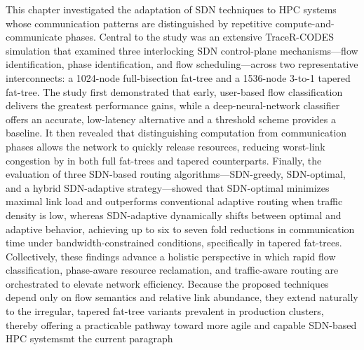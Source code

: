 This chapter investigated the adaptation of SDN techniques to HPC systems whose
communication patterns are distinguished by repetitive compute-and-communicate
phases. Central to the study was an extensive TraceR-CODES simulation that
examined three interlocking SDN control-plane mechanisms—flow identification,
phase identification, and flow scheduling—across two representative
interconnects: a 1024-node full-bisection fat-tree and a 1536-node 3-to-1
tapered fat-tree. The study first demonstrated that early, user-based flow
classification delivers the greatest performance gains, while a
deep-neural-network classifier offers an accurate, low-latency alternative and a
threshold scheme provides a baseline. It then revealed that distinguishing
computation from communication phases allows the network to quickly release
resources, reducing worst-link congestion by in both full
fat-trees and tapered counterparts. Finally, the evaluation of
three SDN-based routing algorithms—SDN-greedy, SDN-optimal, and a hybrid
SDN-adaptive strategy—showed that SDN-optimal minimizes maximal link load and
outperforms conventional adaptive routing when traffic density is low, whereas
SDN-adaptive dynamically shifts between optimal and adaptive behavior, achieving
up to six to seven fold reductions in communication time under
bandwidth-constrained conditions, specifically in tapered fat-trees.
Collectively, these findings advance a holistic perspective in which rapid flow
classification, phase-aware resource reclamation, and traffic-aware routing are
orchestrated to elevate network efficiency. Because the proposed techniques
depend only on flow semantics and relative link abundance, they extend naturally
to the irregular, tapered fat-tree variants prevalent in production clusters,
thereby offering a practicable pathway toward more agile and capable SDN-based
HPC systemsmt the current paragraph
